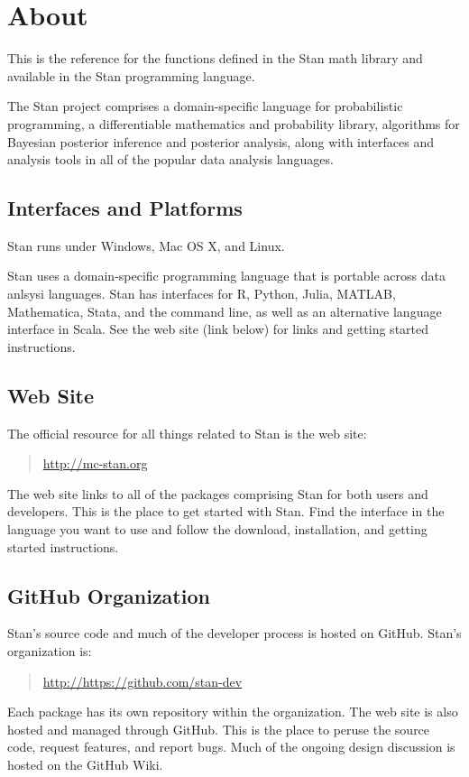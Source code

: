 \chapter*{About}

\noindent
This is the reference for the functions defined in the Stan math
library and available in the Stan programming language.

The Stan project comprises a domain-specific language for
probabilistic programming, a differentiable mathematics and
probability library, algorithms for Bayesian posterior inference and
posterior analysis, along with interfaces and analysis tools in all of
the popular data analysis languages.


\section*{Interfaces and Platforms}

Stan runs under Windows, Mac OS X, and Linux.

Stan uses a domain-specific programming language that is portable
across data anlsysi languages.  Stan has interfaces for R, Python,
Julia, MATLAB, Mathematica, Stata, and the command line, as well
as an alternative language interface in Scala.  See the web
site (link below) for links and getting started instructions.

\section*{Web Site}

The official resource for all things related to Stan is the web site:
%
\begin{quote}
\url{http://mc-stan.org}
\end{quote}
%
The web site links to all of the packages comprising Stan for both
users and developers.  This is the place to get started with Stan.
Find the interface in the language you want to use and follow the
download, installation, and getting started instructions.  


\section*{GitHub Organization}

Stan's source code and much of the developer process is hosted on
GitHub.  Stan's organization is:
%
\begin{quote}
\url{http://https://github.com/stan-dev}
\end{quote}
%
Each package has its own repository within the 
organization.  The web site is also hosted and managed through GitHub.
This is the place to peruse the source code, request features, and
report bugs.  Much of the ongoing design discussion is hosted on the
GitHub Wiki.


